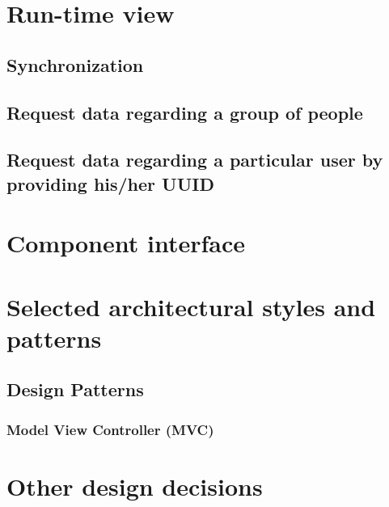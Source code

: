     \section{Run-time view}
        \subsection{Synchronization}
        \subsection{Request data regarding a group of people}
        \subsection{Request data regarding a particular user by providing his/her UUID}
    \section{Component interface}
    \section{Selected architectural styles and patterns}    
        \subsection{Design Patterns}
            \subsubsection*{Model View Controller (MVC)}
    \section{Other design decisions}